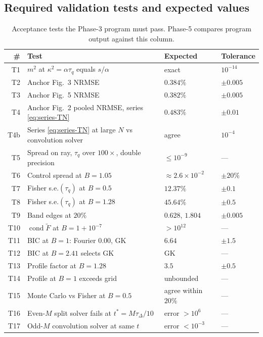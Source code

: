 \documentclass[11pt,a4paper]{article}
\theoremstyle{definition}
\newcommand{\tq}{\tau_{q}}
\newcommand{\kk}{\kappa^{2}}
\newcommand{\Bnum}{B}
\begin{document}
\subsection{Required validation tests and expected values}

\begin{table}[H]
\centering
\caption{Acceptance tests the Phase-3 program must pass. Phase-5 compares
         program output against this column.}
\label{tab:acceptance}
\small
\begin{tabularx}{\textwidth}{@{}rXll@{}}
\toprule
\# & Test & Expected & Tolerance \\
\midrule
T1 & $m^{2}$ at $\kk=\alpha\tq$ equals $s/\alpha$ & exact &
  $10^{-14}$ \\
T2 & Anchor Fig.~3 NRMSE & $0.384\%$ & $\pm0.005$ \\
T3 & Anchor Fig.~5 NRMSE & $0.382\%$ & $\pm0.005$ \\
T4 & Anchor Fig.~2 pooled NRMSE, series \eqref{eq:series-TN} & $0.483\%$ & $\pm0.01$ \\
T4b & Series \eqref{eq:series-TN} at large $N$ vs convolution solver & agree & $10^{-4}$ \\
T5 & Spread on ray, $\tq$ over $100\times$, double precision &
  $\leq10^{-9}$ & --- \\
T6 & Control spread at $\Bnum=1.05$ & $\approx2.6\times10^{-2}$ &
  $\pm20\%$ \\
T7 & Fisher s.e.$(\tq)$ at $\Bnum=0.5$ & $12.37\%$ & $\pm0.1$ \\
T8 & Fisher s.e.$(\tq)$ at $\Bnum=1.28$ & $45.64\%$ & $\pm0.5$ \\
T9 & Band edges at $20\%$ & $0.628$, $1.804$ & $\pm0.005$ \\
T10 & $\operatorname{cond}\tilde F$ at $\Bnum=1+10^{-7}$ &
  $>10^{12}$ & --- \\
T11 & BIC at $\Bnum=1$: Fourier $0.00$, GK & $6.64$ & $\pm1.5$ \\
T12 & BIC at $\Bnum=2.41$ selects GK & GK & --- \\
T13 & Profile factor at $\Bnum=1.28$ & $3.5$ & $\pm0.5$ \\
T14 & Profile at $\Bnum=1$ exceeds grid & unbounded & --- \\
T15 & Monte Carlo vs Fisher at $\Bnum=0.5$ & agree within $20\%$ & --- \\
T16 & Even-$M$ split solver fails at $t^{\ast}=M\tau_{\Delta}/10$ &
  error $>10^{6}$ & --- \\
T17 & Odd-$M$ convolution solver at same $t$ & error $<10^{-3}$ & --- \\

\end{tabularx}
\end{table}
\end{document}
